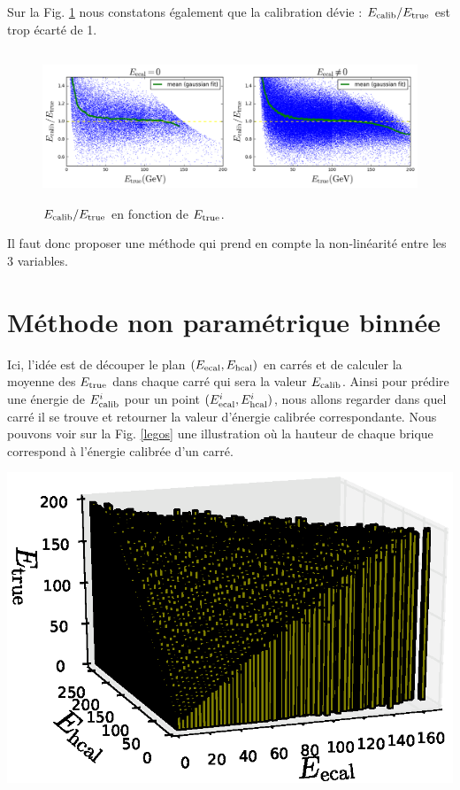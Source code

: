 \documentclass[11pt,a4paper]{article}
\begin{document}
Sur la Fig. \ref{LR_ecaliboveretrue_etrue} nous constatons également que la calibration dévie : $E_{\rm calib}/E_{\rm true}$  est trop écarté de 1.
\begin{figure}[!h]
\begin{center}
\includegraphics[height =4.5cm]{images/pictures/testLinearRegression/LinearRegression_ecalib_over_etrue.png}
\caption{$E_{\rm calib}/E_{\rm true}$ en fonction de $E_{\rm true}$.}
\label{LR_ecaliboveretrue_etrue}
\end{center}
\end{figure}

Il faut donc proposer une méthode qui prend en compte la non-linéarité entre les 3 variables. 



\section{Méthode non paramétrique binnée}
\label{CL}
\noindent
\begin{minipage}{0.60\linewidth}
Ici, l'idée est de découper le plan $(E_{\rm ecal},E_{\rm hcal})$ en carrés et de calculer la moyenne des $E_{\rm true}$ dans chaque carré qui sera la valeur $E_{\rm calib}$. Ainsi pour prédire une énergie de $E_{\rm calib}^i$ pour un point $(E_{\rm ecal}^i,E_{\rm hcal}^i)$, nous allons regarder dans quel carré il se trouve et retourner la valeur d'énergie calibrée correspondante. Nous pouvons voir sur la Fig. \ref{legos} une illustration où la hauteur de chaque brique correspond à l'énergie calibrée d'un carré.
\end{minipage}
\begin{minipage}{0.4\linewidth}
	\includegraphics[width=\linewidth]{images/pictures/testCalibrationLego/CalibrationLego_plot3D_legos.eps}
	\label{legos}
\end{minipage}
\end{document}
